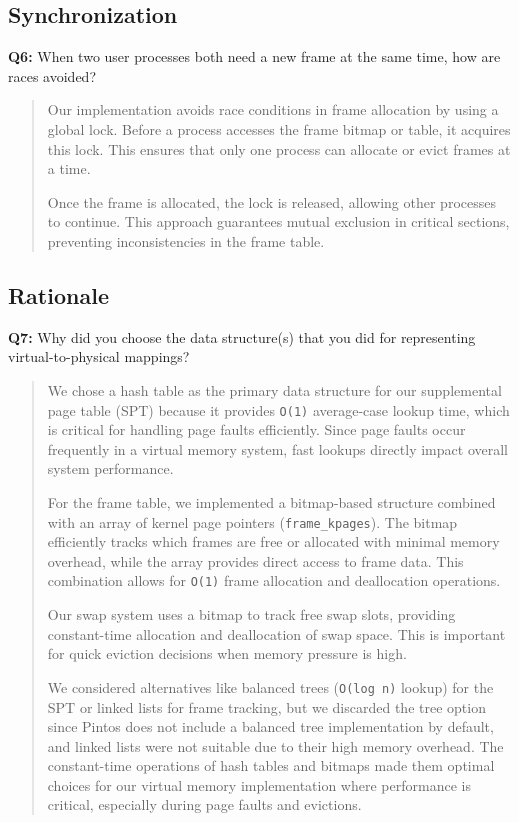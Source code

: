 \documentclass[a4paper,11pt]{paper}
\begin{document}
\subsection{Synchronization}

\textbf{Q6:} When two user processes both need a new frame at the same time, how are races avoided?

\begin{quote}
Our implementation avoids race conditions in frame allocation by using a global lock. Before a process accesses the frame bitmap or table, it acquires this lock. This ensures that only one process can allocate or evict frames at a time.

Once the frame is allocated, the lock is released, allowing other processes to continue. This approach guarantees mutual exclusion in critical sections, preventing inconsistencies in the frame table.
\end{quote}

\subsection{Rationale}
\textbf{Q7:} Why did you choose the data structure(s) that you did for representing virtual-to-physical mappings?

\begin{quote}
We chose a hash table as the primary data structure for our supplemental page table (SPT) because it provides \texttt{O(1)} average-case lookup time, which is critical for handling page faults efficiently. Since page faults occur frequently in a virtual memory system, fast lookups directly impact overall system performance.

For the frame table, we implemented a bitmap-based structure combined with an array of kernel page pointers (\texttt{frame\_kpages}). The bitmap efficiently tracks which frames are free or allocated with minimal memory overhead, while the array provides direct access to frame data. This combination allows for \texttt{O(1)} frame allocation and deallocation operations.

Our swap system uses a bitmap to track free swap slots, providing constant-time allocation and deallocation of swap space. This is important for quick eviction decisions when memory pressure is high.

We considered alternatives like balanced trees (\texttt{O(log n)} lookup) for the SPT or linked lists for frame tracking, but we discarded the tree option since Pintos does not include a balanced tree implementation by default, and linked lists were not suitable due to their high memory overhead. The constant-time operations of hash tables and bitmaps made them optimal choices for our virtual memory implementation where performance is critical, especially during page faults and evictions.
\end{quote}
\end{document}
